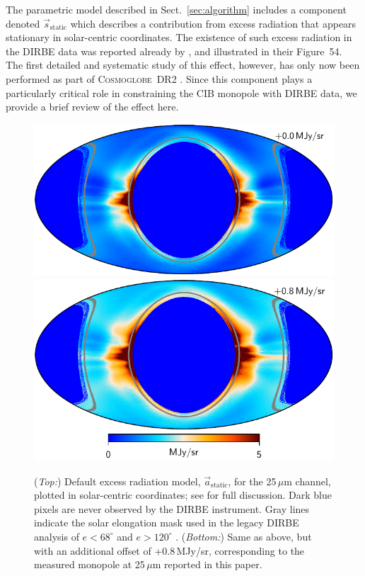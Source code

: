 \documentclass{aa}
\newcommand{\s}[0]{\vec{s}}
\renewcommand{\a}[0]{\vec{a}}
\newcommand{\cosmoglobe}{\textsc{Cosmoglobe}}
\begin{document}
The parametric model described in Sect.~\ref{sec:algorithm} includes a
component denoted $\s_{\mathrm{static}}$ which describes a
contribution from excess radiation that appears stationary in
solar-centric coordinates. The existence of such excess radiation in
the DIRBE data was reported already by \citet{leinert:1998}, and
illustrated in their Figure~54. The first detailed and systematic
study of this effect, however, has only now been performed as part of
\cosmoglobe\ DR2 \citep{CG02_01}. Since this component plays a
particularly critical role in constraining the CIB monopole with DIRBE
data, we provide a brief review of the effect here.

\begin{figure}
  \centering
  \includegraphics[width=\linewidth]{figs/solarmap_06_v1_mono0.pdf}\\
  \includegraphics[width=\linewidth]{figs/solarmap_06_v1_mono8.pdf}
  \caption{(\emph{Top:}) Default excess radiation model, $\a_{\mathrm{static}}$, for the 25\,$\mu$m channel, plotted in solar-centric coordinates; see \citet{CG02_01} for full discussion. Dark blue pixels are never observed by the DIRBE instrument. Gray lines indicate the solar elongation mask used in the legacy DIRBE analysis of $e < 68^{\circ}$ and $e >120^{\circ}$ \citep{kelsall1998}. (\emph{Bottom:}) Same as above, but with an additional offset of +0.8\,MJy/sr, corresponding to the measured monopole at 25\,$\mu$m reported in this paper.}
  \label{fig:sidelobe}
\end{figure}
\end{document}
